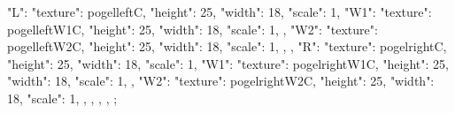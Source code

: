 {{{      "L": {
        "texture": pogelleftC,
        "height": 25,
        "width": 18,
        "scale": 1,
        "W1": {
          "texture": pogelleftW1C,
          "height": 25,
          "width": 18,
          "scale": 1,
        },
        "W2": {
          "texture": pogelleftW2C,
          "height": 25,
          "width": 18,
          "scale": 1,
        },
      },
      "R": {
        "texture": pogelrightC,
        "height": 25,
        "width": 18,
        "scale": 1,
        "W1": {
          "texture": pogelrightW1C,
          "height": 25,
          "width": 18,
          "scale": 1,
        },
        "W2": {
          "texture": pogelrightW2C,
          "height": 25,
          "width": 18,
          "scale": 1,
        },
      },
    },
  },
};